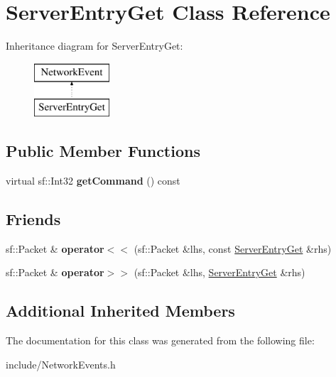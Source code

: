 \hypertarget{class_server_entry_get}{\section{Server\-Entry\-Get Class Reference}
\label{class_server_entry_get}
}
Inheritance diagram for Server\-Entry\-Get\-:\begin{figure}[H]
\begin{center}
\leavevmode
\includegraphics[height=2.000000cm]{class_server_entry_get}
\end{center}
\end{figure}
\subsection*{Public Member Functions}
\begin{DoxyCompactItemize}
\item 
\hypertarget{class_server_entry_get_a8ac2bfd76dde2b9a7a0536cc9b11c64a}{virtual sf\-::\-Int32 {\bfseries get\-Command} () const }\label{class_server_entry_get_a8ac2bfd76dde2b9a7a0536cc9b11c64a}

\end{DoxyCompactItemize}
\subsection*{Friends}
\begin{DoxyCompactItemize}
\item 
\hypertarget{class_server_entry_get_af357ae32ae1296c4c36175512cced91b}{sf\-::\-Packet \& {\bfseries operator$<$$<$} (sf\-::\-Packet \&lhs, const \hyperlink{class_server_entry_get}{Server\-Entry\-Get} \&rhs)}\label{class_server_entry_get_af357ae32ae1296c4c36175512cced91b}

\item 
\hypertarget{class_server_entry_get_abff6a0041fd25a336820678606e0c98c}{sf\-::\-Packet \& {\bfseries operator$>$$>$} (sf\-::\-Packet \&lhs, \hyperlink{class_server_entry_get}{Server\-Entry\-Get} \&rhs)}\label{class_server_entry_get_abff6a0041fd25a336820678606e0c98c}

\end{DoxyCompactItemize}
\subsection*{Additional Inherited Members}


The documentation for this class was generated from the following file\-:\begin{DoxyCompactItemize}
\item 
include/Network\-Events.\-h\end{DoxyCompactItemize}
